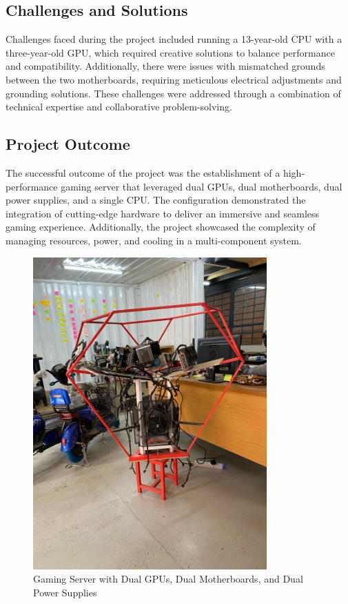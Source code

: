 \subsection{Challenges and Solutions}

Challenges faced during the project included running a 13-year-old CPU with a three-year-old GPU, which required creative solutions to balance performance and compatibility. Additionally, there were issues with mismatched grounds between the two motherboards, requiring meticulous electrical adjustments and grounding solutions. These challenges were addressed through a combination of technical expertise and collaborative problem-solving.

\subsection{Project Outcome}

The successful outcome of the project was the establishment of a high-performance gaming server that leveraged dual GPUs, dual motherboards, dual power supplies, and a single CPU. The configuration demonstrated the integration of cutting-edge hardware to deliver an immersive and seamless gaming experience. Additionally, the project showcased the complexity of managing resources, power, and cooling in a multi-component system.

\begin{figure}[H]
    \centering
    \includegraphics[width=0.8\textwidth]{images/gaming-server.jpeg}
    \caption{Gaming Server with Dual GPUs, Dual Motherboards, and Dual Power Supplies}
    \label{fig:Gaming Server with Dual GPUs, Dual Motherboards, and Dual Power Supplies}
\end{figure}